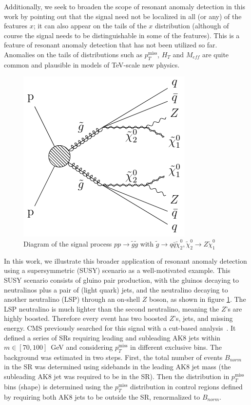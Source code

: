 \documentclass[prd, twocolumn, superscriptaddress,floatfix, nofootinbib, preprintnumbers]{revtex4-2}
\begin{document}
Additionally, we seek to broaden the scope of resonant anomaly detection in this work by pointing out that the signal need not be localized in all (or any) of the features $x$; it can also appear on the tails of the $x$ distribution (although of course the signal needs to be distinguishable in some of the features). This is a feature of resonant anomaly detection that has not been utilized so far. 
Anomalies on the tails of distributions such as $p_T^\text{miss}$, $H_T$ and $M_{eff}$ are quite common and plausible in models of TeV-scale new physics.


\begin{figure}[t]
\centering
\includegraphics[width=0.6\linewidth]{feynman_diag.pdf}
\caption{Diagram of the signal process $p p \rightarrow \widetilde{g} \widetilde{g}$ with $ \widetilde{g}\rightarrow q \bar{q} \widetilde{\chi}_2^0, \widetilde{\chi}_2^0 \rightarrow Z \widetilde{\chi}_1^0$}
\label{fig:feynman_diag}
\end{figure}

In this work, we illustrate this broader application of resonant anomaly detection using a supersymmetric (SUSY) scenario as a well-motivated example. This SUSY scenario consists of gluino pair production, with the gluinos decaying to neutralinos plus a pair of (light quark) jets, and the neutralino decaying to another neutralino (LSP) through an on-shell $Z$ boson, as shown in figure \ref{fig:feynman_diag}. The LSP neutralino is much lighter than the second neutralino, meaning the $Z$'s are highly boosted. Therefore every event has two boosted $Z$'s, jets, and missing energy. CMS previously searched for this signal with a cut-based analysis~\cite{CMS:2020fia}. It defined a series of SRs requiring leading and subleading AK8 jets within $m\in[70,100]$~GeV and considering $p_T^\text{miss}$ in different exclusive bins. The background was estimated in two steps. First, the total number of events $B_{norm}$ in the SR was determined using sidebands in the leading AK8 jet mass (the subleading AK8 jet was required to be in the SR). Then the distribution in $p_T^\text{miss}$ bins (shape) is determined using the $p_T^\text{miss}$ distribution in control regions defined by requiring both AK8 jets to be outside the SR, renormalized to $B_{norm}$. 
\end{document}
